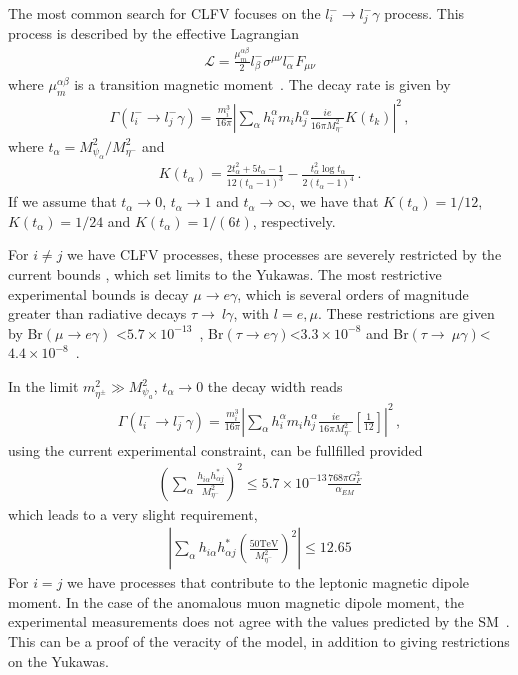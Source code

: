 \documentclass[12pt]{article}
\begin{document}
The most common search for CLFV focuses on the $l^{-}_{i} \to l^{-}_{j} \gamma$ process. This process is described by the effective Lagrangian
%
\begin{align}
    \mathcal{L} = \frac{\mu_{m}^{\alpha \beta}}{2} l^{-}_{\beta} \sigma^{\mu \nu} l^{-}_{\alpha} F_{\mu \nu}
\end{align}
%
where $\mu_{m}^{\alpha \beta}$ is a transition magnetic moment~\cite{Toma:2013zsa}.
The decay rate is given by~\cite{Lavoura:2003xp}
%
\begin{align}
 \Gamma(l^{-}_{i} \to l^{-}_{j} \gamma) = \frac{m^{3}_{i}}{16 \pi} \left| \sum_{\alpha} h^{\alpha}_{i} m_{i} h^{\alpha}_{j} \frac{i e}{16 \pi M^{2}_{\eta^{-}}} K(t_{k}) \right|^{2}\,, 
\end{align}
%
where $t_{\alpha} = M^{2}_{\psi_{\alpha}}/M^{2}_{\eta^{-}}$ and
%
\begin{align}
    K(t_{\alpha}) = \frac{2t_{\alpha}^{2}+5t_{\alpha}-1}{12(t_{\alpha}-1)^{3}} - \frac{t_{\alpha}^{2}\log t_{\alpha}}{2(t_{\alpha}-1)^{4}}\,.
\end{align}
%
If we assume that $t_{\alpha} \to 0$, $t_{\alpha} \to 1$ and $t_{\alpha} \to \infty$, we have that $K(t_{\alpha}) = 1/12$, $K(t_{\alpha}) = 1/24$ and $K(t_{\alpha}) = 1/(6t)$, respectively.

For $i \neq j$ we have CLFV processes, these processes are severely restricted by the current bounds , which set limits to the Yukawas. The most restrictive experimental bounds is decay $\mu \to e \gamma$, which is several orders of magnitude greater than radiative decays $\tau \to~l\gamma$, with $l = e, \mu$. These restrictions are given by Br$(\mu \to e\gamma)$ \textless $5.7 \times 10^{-13} $~\cite{Adam:2013mnn}, Br$(\tau \to e\gamma) $\textless$ 3.3 \times 10^{-8}$ and Br$(\tau \to~\mu\gamma) $\textless$ 4.4 \times 10^{-8}$~\cite{Aubert:2009ag, Bona:2007qt, Miyazaki:2012mx}. 

In the limit $m_{\eta^{\pm}}^{2} \gg M_{\psi_{a}}^{2}$, $t_{\alpha} \to 0$ the decay width reads
%
\begin{align}
 \Gamma(l^{-}_{i} \to l^{-}_{j} \gamma) = \frac{m^{3}_{i}}{16 \pi} \left| \sum_{\alpha} h^{\alpha}_{i} m_{i} h^{\alpha}_{j} \frac{i e}{16 \pi M^{2}_{\eta^{-}}} \left[ \frac{1}{12} \right] \right|^{2}\,, 
\end{align}
%
using the current experimental constraint, can be fullfilled provided
%
\begin{align*}
    \left( \sum_{\alpha} \frac{h^{}_{i \alpha} h_{\alpha j}^{*}}{M^{2}_{\eta^{-}}} \right)^{2} \leq 5.7 \times 10^{-13} \frac{768 \pi G_{F}^{2}}{\alpha_{EM}}
\end{align*}
%
which leads to a very slight requirement,
\begin{align*}
    \left| \sum_{\alpha}h^{}_{i \alpha} h_{\alpha j}^{*}\left(\frac{50\text{TeV}}{M^{2}_{\eta^{-}}} \right)^{2} \right| \leq 12.65
\end{align*}
%
For $i = j$ we have processes that contribute to the leptonic magnetic dipole moment. In the case of the anomalous muon magnetic dipole moment, the experimental measurements does not agree with the values predicted by the SM~\cite{Lindner:2016bgg}. This can be a proof of the veracity of the model, in addition to giving restrictions on the Yukawas.
\end{document}
